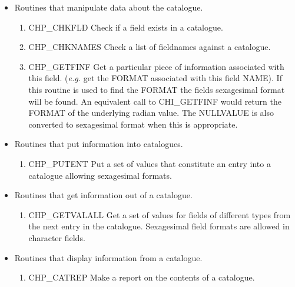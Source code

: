 \begin{itemize}
\item Routines that manipulate data about the catalogue.

 \begin{enumerate}

  \item CHP\_CHKFLD Check if a field exists in a catalogue.

  \item CHP\_CHKNAMES Check a list of fieldnames against a catalogue.

\item CHP\_GETFINF Get a particular piece of information associated with this 
field. ({\em e.g.} get the FORMAT associated with this field NAME). If this
routine is used to find the FORMAT the fields sexagesimal format will be found.
An equivalent call to CHI\_GETFINF would return the FORMAT of the underlying 
radian value. The NULLVALUE is also converted to sexagesimal format when this
is appropriate.

 \end{enumerate}


\item Routines that put information into catalogues.

 \begin{enumerate}


  \item CHP\_PUTENT Put a set of values that constitute an entry into a 
      catalogue allowing sexagesimal formats.

 \end{enumerate}

\item Routines that get information out of a catalogue.

 \begin{enumerate}

  \item  CHP\_GETVALALL Get a set of values for fields of different types
  from the next entry in the catalogue. Sexagesimal field formats
  are allowed in character fields.

 \end{enumerate}

\item Routines that display information from a catalogue.

 \begin{enumerate}

  \item  CHP\_CATREP Make a report on the contents of a catalogue.


\end{enumerate}
\end{itemize}
